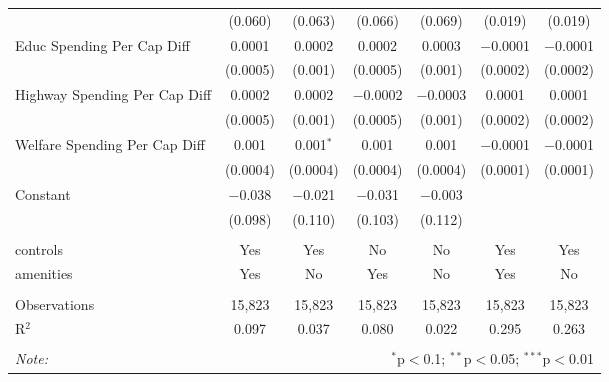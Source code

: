 \begin{table}[!htbp]
\begin{tabular}{@{\extracolsep{5pt}}lcccccc}
  & (0.060) & (0.063) & (0.066) & (0.069) & (0.019) & (0.019) \\ 
  Educ Spending Per Cap Diff & 0.0001 & 0.0002 & 0.0002 & 0.0003 & $-$0.0001 & $-$0.0001 \\ 
  & (0.0005) & (0.001) & (0.0005) & (0.001) & (0.0002) & (0.0002) \\ 
  Highway Spending Per Cap Diff & 0.0002 & 0.0002 & $-$0.0002 & $-$0.0003 & 0.0001 & 0.0001 \\ 
  & (0.0005) & (0.001) & (0.0005) & (0.001) & (0.0002) & (0.0002) \\ 
  Welfare Spending Per Cap Diff & 0.001 & 0.001$^{*}$ & 0.001 & 0.001 & $-$0.0001 & $-$0.0001 \\ 
  & (0.0004) & (0.0004) & (0.0004) & (0.0004) & (0.0001) & (0.0001) \\ 
  Constant & $-$0.038 & $-$0.021 & $-$0.031 & $-$0.003 &  &  \\ 
  & (0.098) & (0.110) & (0.103) & (0.112) &  &  \\ 
 \hline \\[-1.8ex] 
controls & Yes & Yes & No & No & Yes & Yes \\ 
amenities & Yes & No & Yes & No & Yes & No \\ 
\hline \\[-1.8ex] 
Observations & 15,823 & 15,823 & 15,823 & 15,823 & 15,823 & 15,823 \\ 
R$^{2}$ & 0.097 & 0.037 & 0.080 & 0.022 & 0.295 & 0.263 \\ 
\hline 
\hline \\[-1.8ex] 
\textit{Note:}  & \multicolumn{6}{r}{$^{*}$p$<$0.1; $^{**}$p$<$0.05; $^{***}$p$<$0.01} \\ 
\end{tabular} 
\end{table} 
